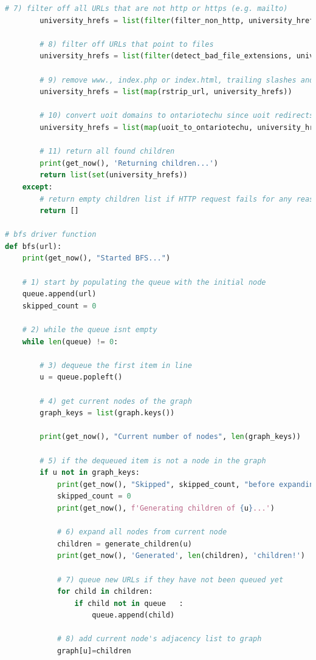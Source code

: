 \begin{lstlisting}[language=Python]
        # 7) filter off all URLs that are not http or https (e.g. mailto)
        university_hrefs = list(filter(filter_non_http, university_hrefs))

        # 8) filter off URLs that point to files
        university_hrefs = list(filter(detect_bad_file_extensions, university_hrefs))

        # 9) remove www., index.php or index.html, trailing slashes and double slashes
        university_hrefs = list(map(rstrip_url, university_hrefs))

        # 10) convert uoit domains to ontariotechu since uoit redirects to ontariotechu
        university_hrefs = list(map(uoit_to_ontariotechu, university_hrefs))

        # 11) return all found children
        print(get_now(), 'Returning children...')
        return list(set(university_hrefs))
    except:
        # return empty children list if HTTP request fails for any reason
        return []

# bfs driver function
def bfs(url):
    print(get_now(), "Started BFS...")

    # 1) start by populating the queue with the initial node
    queue.append(url)
    skipped_count = 0

    # 2) while the queue isnt empty
    while len(queue) != 0:

        # 3) dequeue the first item in line
        u = queue.popleft()

        # 4) get current nodes of the graph
        graph_keys = list(graph.keys())

        print(get_now(), "Current number of nodes", len(graph_keys))

        # 5) if the dequeued item is not a node in the graph
        if u not in graph_keys:
            print(get_now(), "Skipped", skipped_count, "before expanding next node!")
            skipped_count = 0
            print(get_now(), f'Generating children of {u}...')

            # 6) expand all nodes from current node
            children = generate_children(u)
            print(get_now(), 'Generated', len(children), 'children!')

            # 7) queue new URLs if they have not been queued yet
            for child in children:
                if child not in queue   :
                    queue.append(child)
            
            # 8) add current node's adjacency list to graph
            graph[u]=children


\end{lstlisting}
